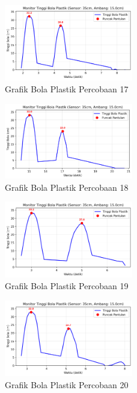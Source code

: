 \begin{figure}[htbp]
    \centering
    \includegraphics[width=0.5\textwidth]{chapters/DataPercobaan/Grafik_Bola_Plastik_17.png}
    \caption{Grafik Bola Plastik Percobaan 17}
\end{figure}
\begin{figure}[htbp]
    \centering
    \includegraphics[width=0.5\textwidth]{chapters/DataPercobaan/Grafik_Bola_Plastik_18.png}
    \caption{Grafik Bola Plastik Percobaan 18}
\end{figure}
\begin{figure}[htbp]
    \centering
    \includegraphics[width=0.5\textwidth]{chapters/DataPercobaan/Grafik_Bola_Plastik_19.png}
    \caption{Grafik Bola Plastik Percobaan 19}
\end{figure}
\begin{figure}[htbp]
    \centering
    \includegraphics[width=0.5\textwidth]{chapters/DataPercobaan/Grafik_Bola_Plastik_20.png}
    \caption{Grafik Bola Plastik Percobaan 20}
\end{figure}

% 